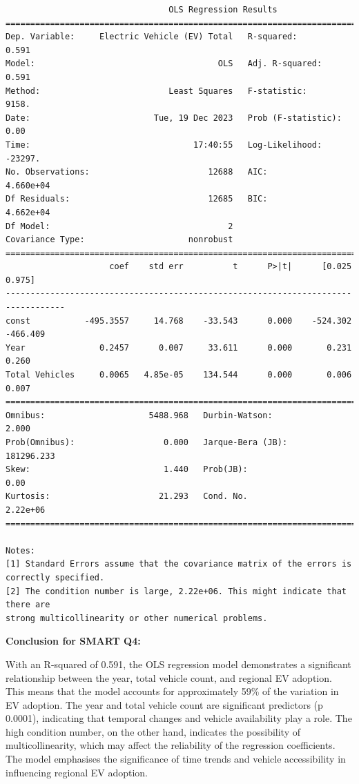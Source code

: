 \documentclass[
  letterpaper,
  DIV=11,
  numbers=noendperiod]{scrartcl}
\begin{document}
\begin{verbatim}
                                 OLS Regression Results                                
=======================================================================================
Dep. Variable:     Electric Vehicle (EV) Total   R-squared:                       0.591
Model:                                     OLS   Adj. R-squared:                  0.591
Method:                          Least Squares   F-statistic:                     9158.
Date:                         Tue, 19 Dec 2023   Prob (F-statistic):               0.00
Time:                                 17:40:55   Log-Likelihood:                -23297.
No. Observations:                        12688   AIC:                         4.660e+04
Df Residuals:                            12685   BIC:                         4.662e+04
Df Model:                                    2                                         
Covariance Type:                     nonrobust                                         
==================================================================================
                     coef    std err          t      P>|t|      [0.025      0.975]
----------------------------------------------------------------------------------
const           -495.3557     14.768    -33.543      0.000    -524.302    -466.409
Year               0.2457      0.007     33.611      0.000       0.231       0.260
Total Vehicles     0.0065   4.85e-05    134.544      0.000       0.006       0.007
==============================================================================
Omnibus:                     5488.968   Durbin-Watson:                   2.000
Prob(Omnibus):                  0.000   Jarque-Bera (JB):           181296.233
Skew:                           1.440   Prob(JB):                         0.00
Kurtosis:                      21.293   Cond. No.                     2.22e+06
==============================================================================

Notes:
[1] Standard Errors assume that the covariance matrix of the errors is correctly specified.
[2] The condition number is large, 2.22e+06. This might indicate that there are
strong multicollinearity or other numerical problems.
\end{verbatim}

\textbf{Conclusion for SMART Q4:}

With an R-squared of 0.591, the OLS regression model demonstrates a
significant relationship between the year, total vehicle count, and
regional EV adoption. This means that the model accounts for
approximately 59\% of the variation in EV adoption. The year and total
vehicle count are significant predictors (p 0.0001), indicating that
temporal changes and vehicle availability play a role. The high
condition number, on the other hand, indicates the possibility of
multicollinearity, which may affect the reliability of the regression
coefficients. The model emphasises the significance of time trends and
vehicle accessibility in influencing regional EV adoption.
\end{document}
